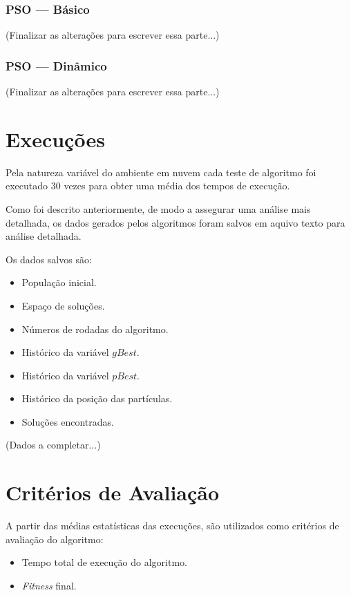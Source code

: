 \subsubsection{PSO — Básico}
(Finalizar as alterações para escrever essa parte...)

\subsubsection{PSO — Dinâmico}
(Finalizar as alterações para escrever essa parte...)

%

%



\section{Execuções}
Pela natureza variável do ambiente em nuvem cada teste de algoritmo foi executado 30 vezes para obter uma média dos tempos de execução.\hfill\vspace{\onelineskip}

Como foi descrito anteriormente, de modo a assegurar uma análise mais detalhada, os dados gerados pelos algoritmos foram salvos em aquivo texto para análise detalhada.\hfill\vspace{\onelineskip}

Os dados salvos são:
\begin{itemize}
\item População inicial.
\item Espaço de soluções.
\item Números de rodadas do algoritmo.
\item Histórico da variável $gBest$.
\item Histórico da variável $pBest$.
\item Histórico da posição das partículas.
\item Soluções encontradas.
\end{itemize}

(Dados a completar...)
% 


\section{Critérios de Avaliação}
A partir das médias estatísticas das execuções, são utilizados como critérios de avaliação do algoritmo: \hfill
\begin{itemize}
\item Tempo total de execução do algoritmo.
\item \textit{Fitness} final.
\end{itemize}

